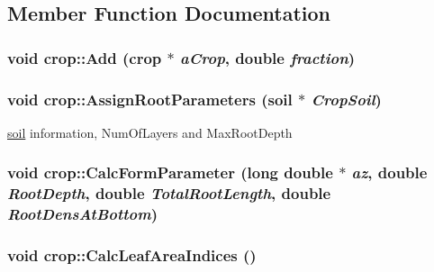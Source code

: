 \subsection{Member Function Documentation}
\hypertarget{classcrop_a09c265a1590e65269b0f767da95dc85f}{
\subsubsection[{Add}]{\setlength{\rightskip}{0pt plus 5cm}void crop::Add ({\bf crop} $\ast$ {\em aCrop}, \/  double {\em fraction})}}
\label{classcrop_a09c265a1590e65269b0f767da95dc85f}
\hypertarget{classcrop_a8c2110cc2b12fed93031787f6c557fcb}{
\subsubsection[{AssignRootParameters}]{\setlength{\rightskip}{0pt plus 5cm}void crop::AssignRootParameters ({\bf soil} $\ast$ {\em CropSoil})}}
\label{classcrop_a8c2110cc2b12fed93031787f6c557fcb}
\hyperlink{classsoil}{soil} information, NumOfLayers and MaxRootDepth \hypertarget{classcrop_a9a07463f05737a8a8e118263e79feccc}{
\subsubsection[{CalcFormParameter}]{\setlength{\rightskip}{0pt plus 5cm}void crop::CalcFormParameter (long double $\ast$ {\em az}, \/  double {\em RootDepth}, \/  double {\em TotalRootLength}, \/  double {\em RootDensAtBottom})}}
\label{classcrop_a9a07463f05737a8a8e118263e79feccc}
\hypertarget{classcrop_a14395e2b72c28aaf9dc729fcd0d3b1c8}{
\subsubsection[{CalcLeafAreaIndices}]{\setlength{\rightskip}{0pt plus 5cm}void crop::CalcLeafAreaIndices ()}}
\label{classcrop_a14395e2b72c28aaf9dc729fcd0d3b1c8}


